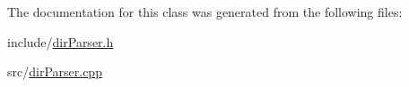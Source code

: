 \-The documentation for this class was generated from the following files\-:\begin{DoxyCompactItemize}
\item 
include/\hyperlink{dir_parser_8h}{dir\-Parser.\-h}\item 
src/\hyperlink{dir_parser_8cpp}{dir\-Parser.\-cpp}\end{DoxyCompactItemize}
